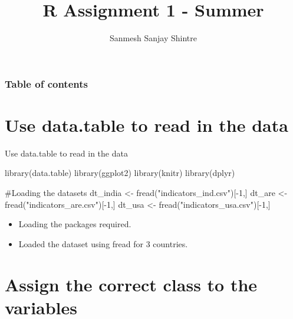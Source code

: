 \documentclass[
  8pt,
  ignorenonframetext,
]{beamer}
\title{R Assignment 1 - Summer}
\author{Sanmesh Sanjay Shintre}
\date{}
\newenvironment{Shaded}{\begin{snugshade}}{\end{snugshade}}
\newcommand{\CommentTok}[1]{\textcolor[rgb]{0.37,0.37,0.37}{#1}}
\newcommand{\DecValTok}[1]{\textcolor[rgb]{0.68,0.00,0.00}{#1}}
\newcommand{\FunctionTok}[1]{\textcolor[rgb]{0.28,0.35,0.67}{#1}}
\newcommand{\NormalTok}[1]{\textcolor[rgb]{0.00,0.23,0.31}{#1}}
\newcommand{\OtherTok}[1]{\textcolor[rgb]{0.00,0.23,0.31}{#1}}
\newcommand{\SpecialCharTok}[1]{\textcolor[rgb]{0.37,0.37,0.37}{#1}}
\newcommand{\StringTok}[1]{\textcolor[rgb]{0.13,0.47,0.30}{#1}}
\renewcommand*\contentsname{Table of contents}
\newcommand\contentsname{Table of contents}
\begin{document}
\frame{\titlepage}

\renewcommand*\contentsname{Table of contents}
\begin{frame}[allowframebreaks]
  \frametitle{Table of contents}
  \setcounter{tocdepth}{3}
  \tableofcontents
\end{frame}

\section{Use data.table to read in the
data}\label{use-data.table-to-read-in-the-data}

\begin{frame}[fragile]{Use data.table to read in the data}
\begin{Shaded}
\begin{Highlighting}[]
\FunctionTok{library}\NormalTok{(data.table)}
\FunctionTok{library}\NormalTok{(ggplot2)  }
\FunctionTok{library}\NormalTok{(knitr)}
\FunctionTok{library}\NormalTok{(dplyr)}

\CommentTok{\#Loading the datasets }
\NormalTok{dt\_india }\OtherTok{\textless{}{-}} \FunctionTok{fread}\NormalTok{(}\StringTok{"indicators\_ind.csv"}\NormalTok{)[}\SpecialCharTok{{-}}\DecValTok{1}\NormalTok{,]}
\NormalTok{dt\_are }\OtherTok{\textless{}{-}} \FunctionTok{fread}\NormalTok{(}\StringTok{"indicators\_are.csv"}\NormalTok{)[}\SpecialCharTok{{-}}\DecValTok{1}\NormalTok{,]}
\NormalTok{dt\_usa }\OtherTok{\textless{}{-}} \FunctionTok{fread}\NormalTok{(}\StringTok{"indicators\_usa.csv"}\NormalTok{)[}\SpecialCharTok{{-}}\DecValTok{1}\NormalTok{,]}
\end{Highlighting}
\end{Shaded}

\begin{itemize}
\item
  Loading the packages required.
\item
  Loaded the dataset using fread for 3 countries.
\end{itemize}
\end{frame}

\section{Assign the correct class to the
variables}\label{assign-the-correct-class-to-the-variables}
\end{document}
